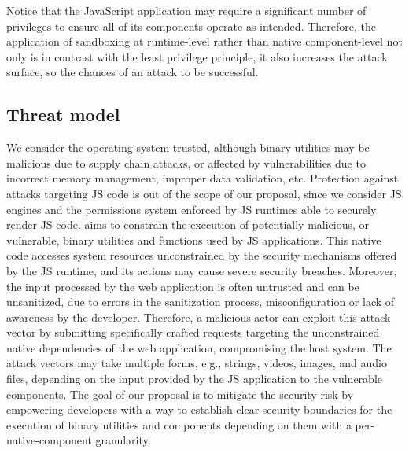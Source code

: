  \vspace{2 mm}
  \noindent Notice that the JavaScript application may require a
  significant number of privileges to ensure all of its components
  operate as intended. Therefore, the application of sandboxing at
  runtime-level rather than native component-level not only is in
  contrast with the least privilege principle, it also increases the
  attack surface, so the chances of an attack to be successful.  

\subsection{Threat model}
\label{sect:threat-model}

We consider the operating system trusted, although binary utilities
may be malicious due to supply chain attacks, or affected by
vulnerabilities due to incorrect memory management, improper data
validation, etc. Protection against attacks targeting JS code is out
of the scope of our proposal, since we consider JS engines and the
permissions system enforced by JS runtimes able to securely render JS
code. \pap aims to constrain the execution of potentially malicious, or vulnerable,
binary utilities and functions used by JS applications.  This native
code accesses system resources unconstrained by the security
mechanisms offered by the JS runtime, and its actions may
cause severe security breaches. Moreover, the input processed by the
web application is often untrusted and can be unsanitized, due to
errors in the sanitization process, misconfiguration or lack of
awareness by the developer.  Therefore, a malicious actor can exploit
this attack vector by submitting specifically crafted requests
targeting the unconstrained native dependencies of the web
application, compromising the host system. The attack vectors may take
multiple forms, e.g., strings, videos, images, and audio files,
depending on the input provided by the JS application to the
vulnerable components. The goal of our proposal is to mitigate the
security risk by
empowering developers with a way to establish clear security
boundaries for the execution of binary utilities and components
depending on them with a per-native-component granularity.

